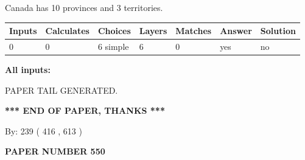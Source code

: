 \documentclass[12pt]{article}
\begin{document}
 
\noindent{}
 
 
Canada has 10  provinces and 3 territories.
 
 
\noindent{}
 
 
   
   
   
   
\noindent\begin{tabular}{|l|l|l|l|l|l|l|}
 \hline
Inputs & Calculates & Choices & Layers & Matches & Answer & Solution \\ \hline
 0  & 
 0  & 
 6
  simple  
  & 
 6  & 
 0  & 
  yes & 
  no 
  \\ \hline
 \end{tabular}
   
   
   
   
\noindent{}
   
   
   
   
\noindent\vspace{0.1in}\hspace{-0.08in} {\textbf{\Large{All inputs: }}}
   
   
   
   
   
   
 \vspace{0.2in}
 
   
   
\vspace{2.0in} PAPER TAIL GENERATED.
   
   
   
   
\vspace{1.0in} 
{\textbf{\large{ *** END OF PAPER, THANKS *** }}} 
   
   
\hspace{1.0in} By: 
 239 ( 416 ,  613 )
   
   
   
   
\newpage 
\setcounter{page}{ 
   550001 } 
   
   
   
   
 {\textbf{ \Large{ PAPER NUMBER  550  }}}
   
   
\vspace{0.2in}
   
   
   
\end{document}
